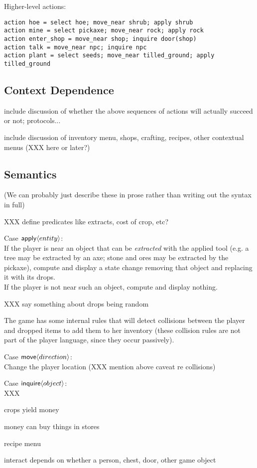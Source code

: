 Higher-level actions:
\begin{verbatim}
action hoe = select hoe; move_near shrub; apply shrub
action mine = select pickaxe; move_near rock; apply rock
action enter_shop = move_near shop; inquire door(shop)
action talk = move_near npc; inquire npc
action plant = select seeds; move_near tilled_ground; apply tilled_ground
\end{verbatim}

\subsection{Context Dependence}

include discussion of whether the above sequences of actions will actually
succeed or not; protocols...

include discussion of inventory menu, shops, crafting, recipes, other contextual menus
(XXX here or later?)

\subsection{Semantics}

(We can probably just describe these in prose rather than writing out the
syntax in full)

XXX define predicates like extracts, cost of crop, etc?

Case $\mathsf{apply}\langle entity \rangle$:\\
If the player is near an object that can be {\em extracted} with the
applied tool (e.g. a tree may be extracted by an axe; stone and ores may be
extracted by the pickaxe), compute and display a state change removing that object and
replacing it with its drops. \\
If the player is not near such an object, compute and display nothing.

XXX say something about drops being random

The game has some internal rules that will detect collisions between the
player and dropped items to add them to her inventory (these collision
rules are not part of the player language, since they occur passively).

Case $\mathsf{move}\langle direction \rangle$:\\
Change the player location (XXX mention above caveat re collisions)


Case $\mathsf{inquire}\langle object \rangle$:\\
XXX

crops yield money

money can buy things in stores

recipe menu

interact depends on whether a person, chest, door, other game object


